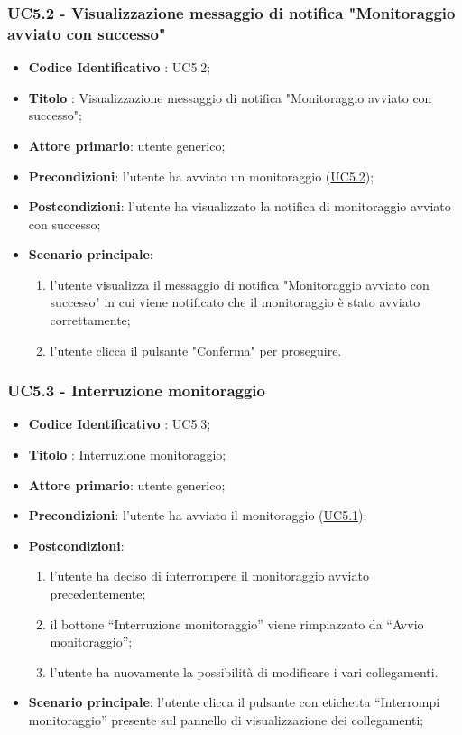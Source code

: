 	\subsubsection{UC5.2 - Visualizzazione messaggio di notifica "Monitoraggio avviato con successo"}	
		\begin{itemize}
			\item\textbf{Codice Identificativo} : UC5.2;
			\item\textbf{Titolo} : Visualizzazione messaggio di notifica "Monitoraggio avviato con successo";
			\item\textbf{Attore primario}: utente generico;
			\item\textbf{Precondizioni}: l'utente ha avviato un monitoraggio (\hyperref[par:UC5.2]{UC5.2});
			\item\textbf{Postcondizioni}: l'utente ha visualizzato la notifica di monitoraggio avviato con successo;
			\item\textbf{Scenario principale}:
				\begin{enumerate}
					\item l'utente visualizza il messaggio di notifica "Monitoraggio avviato con successo" in cui viene notificato che il monitoraggio è stato avviato correttamente;
					\item l'utente clicca il pulsante "Conferma" per proseguire.		
				\end{enumerate}		
		\end{itemize}
		
		\label{par:UC5.3}
	\subsubsection{UC5.3 - Interruzione monitoraggio}
		\begin{itemize}
			\item\textbf{Codice Identificativo} : UC5.3;
			\item\textbf{Titolo} : Interruzione monitoraggio;
			\item\textbf{Attore primario}: utente generico;
			\item\textbf{Precondizioni}: l'utente ha avviato il monitoraggio (\hyperref[par:UC5.1]{UC5.1});
			\item\textbf{Postcondizioni}:
				\begin{enumerate}
					\item l'utente ha deciso di interrompere il monitoraggio avviato precedentemente;
					\item il bottone “Interruzione monitoraggio” viene rimpiazzato da “Avvio monitoraggio”;
					\item l'utente ha nuovamente la possibilità di modificare i vari collegamenti.
				\end{enumerate}	
			\item\textbf{Scenario principale}: l'utente clicca il pulsante con etichetta “Interrompi monitoraggio” presente sul pannello di visualizzazione dei collegamenti;
			
		\end{itemize}

